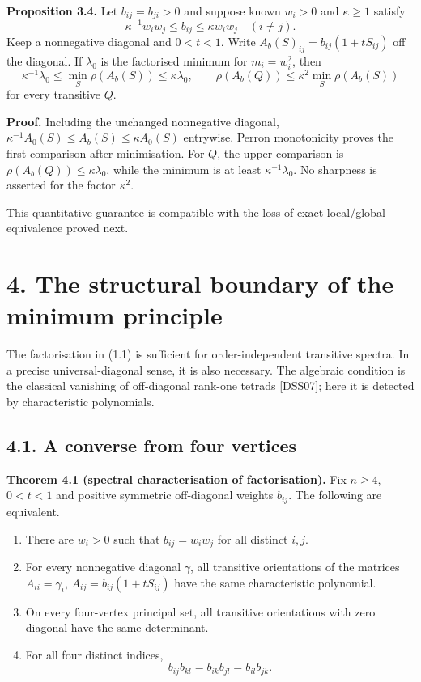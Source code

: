\documentclass[
  11pt,
  a4paper,
]{article}
\providecommand{\tightlist}{%
  \setlength{\itemsep}{0pt}\setlength{\parskip}{0pt}}
\begin{document}
\textbf{Proposition 3.4.} Let \(b_{ij}=b_{ji}>0\) and suppose known
\(w_i>0\) and \(\kappa\ge1\) satisfy
\[\kappa^{-1}w_iw_j\le b_{ij}\le\kappa w_iw_j\quad(i\ne j).\] Keep a
nonnegative diagonal and \(0<t<1\). Write
\(A_b(S)_{ij}=b_{ij}(1+tS_{ij})\) off the diagonal. If \(\lambda_0\) is
the factorised minimum for \(m_i=w_i^2\), then \[
 \kappa^{-1}\lambda_0\le\min_S\rho(A_b(S))\le\kappa\lambda_0,
 \qquad
 \rho(A_b(Q))\le\kappa^2\min_S\rho(A_b(S))                 \tag{3.6}
\] for every transitive \(Q\).

\textbf{Proof.} Including the unchanged nonnegative diagonal,
\(\kappa^{-1}A_0(S)\le A_b(S)\le\kappa A_0(S)\) entrywise. Perron
monotonicity proves the first comparison after minimisation. For \(Q\),
the upper comparison is \(\rho(A_b(Q))\le\kappa\lambda_0\), while the
minimum is at least \(\kappa^{-1}\lambda_0\). No sharpness is asserted
for the factor \(\kappa^2\).

This quantitative guarantee is compatible with the loss of exact
local/global equivalence proved next.

\section{4. The structural boundary of the minimum
principle}\label{the-structural-boundary-of-the-minimum-principle}

The factorisation in (1.1) is sufficient for order-independent
transitive spectra. In a precise universal-diagonal sense, it is also
necessary. The algebraic condition is the classical vanishing of
off-diagonal rank-one tetrads {[}DSS07{]}; here it is detected by
characteristic polynomials.

\subsection{4.1. A converse from four
vertices}\label{a-converse-from-four-vertices}

\textbf{Theorem 4.1 (spectral characterisation of factorisation).} Fix
\(n\ge4\), \(0<t<1\) and positive symmetric off-diagonal weights
\(b_{ij}\). The following are equivalent.

\begin{enumerate}
\def\labelenumi{\arabic{enumi}.}
\tightlist
\item
  There are \(w_i>0\) such that \(b_{ij}=w_iw_j\) for all distinct
  \(i,j\).
\item
  For every nonnegative diagonal \(\gamma\), all transitive orientations
  of the matrices \(A_{ii}=\gamma_i\), \(A_{ij}=b_{ij}(1+tS_{ij})\) have
  the same characteristic polynomial.
\item
  On every four-vertex principal set, all transitive orientations with
  zero diagonal have the same determinant.
\item
  For all four distinct indices,
  \[b_{ij}b_{kl}=b_{ik}b_{jl}=b_{il}b_{jk}.                    \tag{4.1}\]
\end{enumerate}
\end{document}

